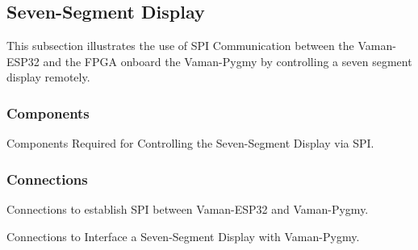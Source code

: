 \subsection{Seven-Segment Display}
This subsection illustrates the use of SPI Communication between the Vaman-ESP32
and the FPGA onboard the Vaman-Pygmy by controlling a seven segment display 
remotely.

\subsubsection{Components}
\begin{table}[!ht]
    \centering
    
    \caption{Components Required for Controlling the Seven-Segment Display via SPI.}
    \label{tab:esp32-fpga-sevenseg-components}
\end{table}

\subsubsection{Connections}
\begin{table}[!ht]
    \centering
    
    \caption{Connections to establish SPI between Vaman-ESP32 and Vaman-Pygmy.}
    \label{tab:esp32-fpga-sevenseg-vaman-connections}
\end{table}

\begin{table}[!ht]
    \centering
    
    \caption{Connections to Interface a Seven-Segment Display with Vaman-Pygmy.}
    \label{tab:esp32-fpga-sevenseg-display-connections}
\end{table}

